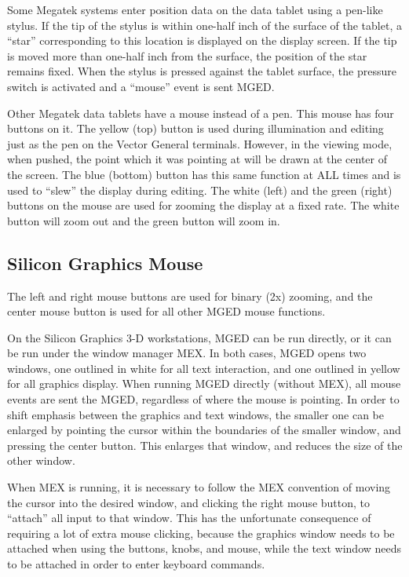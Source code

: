 Some Megatek systems enter position data on the data tablet
using a pen-like stylus.
If the tip of the stylus is
within one-half inch of the surface of the tablet, a ``star'' corresponding
to this location is displayed on the display screen.  If the tip is moved
more than one-half inch from the surface, the position of the star remains
fixed.  When the stylus is pressed against the tablet surface, the pressure
switch is activated and a ``mouse'' event is sent MGED.

Other Megatek data tablets have a mouse instead of a pen.
This mouse has four buttons on it.
The yellow (top) button is used during illumination and editing just as the
pen on the Vector General terminals.
However, in the viewing mode, when pushed, the point which it was pointing
at will be drawn at the center of the screen.
The blue (bottom) button has this same function at ALL times and is used
to ``slew'' the display during editing.
The white (left) and the green (right) buttons on the mouse are used for
zooming the display at a fixed rate.
The white button will zoom out and the green button will zoom in.

\subsection{Silicon Graphics Mouse}

The left and right mouse buttons are used for binary (2x) zooming,
and the center mouse button is used for all other MGED mouse functions.

On the Silicon Graphics 3-D workstations, MGED can be run directly,
or it can be run under the window manager MEX.  In both cases,
MGED opens two windows, one outlined in white for all text interaction,
and one outlined in yellow for all graphics display.
When running MGED directly (without MEX), all mouse events are
sent the MGED, regardless of where the mouse is pointing.
In order to shift emphasis between the graphics and text windows,
the smaller one can be enlarged by pointing the cursor within the
boundaries of the smaller window, and pressing the center button.
This enlarges that window, and reduces the size of the other window.

When MEX is running, it is necessary to follow the MEX convention of
moving the cursor into the desired window, and clicking the right mouse
button, to ``attach'' all input to that window.
This has the unfortunate consequence of requiring a lot of extra
mouse clicking, because the graphics window needs to be attached
when using the buttons, knobs, and mouse, while the text window
needs to be attached in order to enter keyboard commands.

